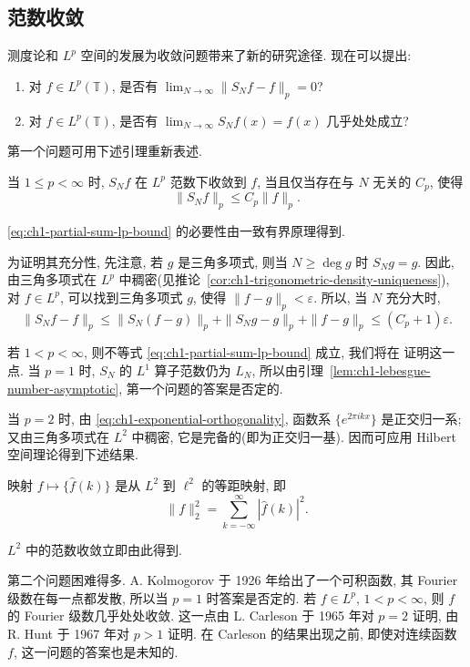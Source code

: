 \subsection{范数收敛}
\label{sec:ch1-norm-convergence}

测度论和 $L^p$ 空间的发展为收敛问题带来了新的研究途径. 现在可以提出:
\begin{enumerate}[label=(\arabic*)]
\item 对 $f\in L^p(\mathbb T)$, 是否有 $\lim_{N\to\infty}\|S_Nf-f\|_p=0$?
\item 对 $f\in L^p(\mathbb T)$, 是否有 $\lim_{N\to\infty}S_Nf(x)=f(x)$ 几乎处处成立?
\end{enumerate}
第一个问题可用下述引理重新表述.

\begin{Lemma}
\label{lem:ch1-lp-partial-sum-convergence}
当 $1\le p<\infty$ 时, $S_Nf$ 在 $L^p$ 范数下收敛到 $f$, 当且仅当存在与 $N$ 无关的 $C_p$, 使得
\begin{equation}
\label{eq:ch1-partial-sum-lp-bound}
 \|S_Nf\|_p\le C_p\|f\|_p.
\end{equation}
\end{Lemma}

\begin{Proof}
\eqref{eq:ch1-partial-sum-lp-bound} 的必要性由一致有界原理得到.

为证明其充分性, 先注意, 若 $g$ 是三角多项式, 则当 $N\ge\deg g$ 时 $S_Ng=g$. 因此, 由三角多项式在 $L^p$ 中稠密(见推论~\ref{cor:ch1-trigonometric-density-uniqueness}), 对 $f\in L^p$, 可以找到三角多项式 $g$, 使得 $\|f-g\|_p<\varepsilon$. 所以, 当 $N$ 充分大时,
\[
 \|S_Nf-f\|_p
 \le\|S_N(f-g)\|_p+\|S_Ng-g\|_p+\|f-g\|_p
 \le(C_p+1)\varepsilon.
\]
\end{Proof}

若 $1<p<\infty$, 则不等式 \eqref{eq:ch1-partial-sum-lp-bound} 成立, 我们将在  证明这一点. 当 $p=1$ 时, $S_N$ 的 $L^1$ 算子范数仍为 $L_N$, 所以由引理~\ref{lem:ch1-lebesgue-number-asymptotic}, 第一个问题的答案是否定的.

当 $p=2$ 时, 由 \eqref{eq:ch1-exponential-orthogonality}, 函数系 $\{e^{2\pi ikx}\}$ 是正交归一系; 又由三角多项式在 $L^2$ 中稠密, 它是完备的(即为正交归一基). 因而可应用 Hilbert 空间理论得到下述结果.

\hypertarget{chapter-01-page-021}{}
\begin{Theorem}
\label{thm:ch1-fourier-l2-isometry-series}
映射 $f\mapsto\{\widehat f(k)\}$ 是从 $L^2$ 到 $\ell^2$ 的等距映射, 即
\[
 \|f\|_2^2=\sum_{k=-\infty}^{\infty}|\widehat f(k)|^2.
\]
\end{Theorem}

$L^2$ 中的范数收敛立即由此得到.

第二个问题困难得多. A. Kolmogorov 于 1926 年给出了一个可积函数, 其 Fourier 级数在每一点都发散, 所以当 $p=1$ 时答案是否定的. 若 $f\in L^p$, $1<p<\infty$, 则 $f$ 的 Fourier 级数几乎处处收敛. 这一点由 L. Carleson 于 1965 年对 $p=2$ 证明, 由 R. Hunt 于 1967 年对 $p>1$ 证明. 在 Carleson 的结果出现之前, 即使对连续函数 $f$, 这一问题的答案也是未知的.


